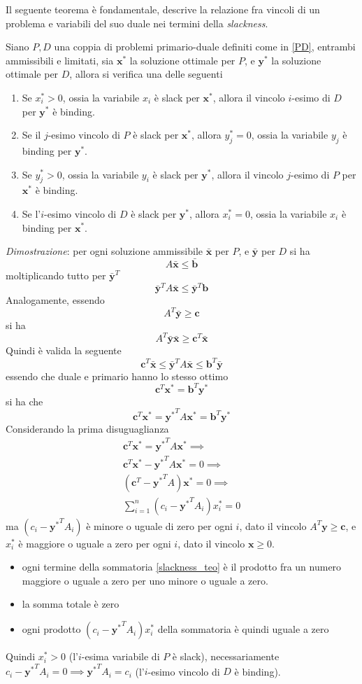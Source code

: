 \documentclass[10pt, letterpaper]{report}
\newcommand{\bb}{{\mathbf{b}}}
\newcommand{\bc}{{\mathbf{c}}}
\newcommand{\x}{{\mathbf{x}}}
\newcommand{\y}{{\mathbf{y}}}
\begin{document}
Il seguente teorema è fondamentale, descrive la relazione fra vincoli di un problema e variabili del suo duale nei termini della \textit{slackness}.
\begin{teorema}\label{complementary_slackness}
    Siano $P,D$ una coppia di problemi primario-duale definiti come in \ref{PD}, entrambi ammissibili e limitati, sia $\x^*$ la soluzione ottimale per $P$, e $\y^*$ la soluzione ottimale per $D$, allora si verifica una delle seguenti\begin{enumerate}
        \item Se $x^*_i>0$, ossia la variabile $x_i$ è slack per $\x^*$, allora il vincolo $i$-esimo di $D$ per $\y^*$ è binding.
        \item Se il $j$-esimo vincolo di $P$ è slack per $\x^*$, allora $y^*_j=0$, ossia
        la variabile $y_j$ è binding per $\y^*$.
        \item Se $y^*_j>0$, ossia la variabile $y_i$ è slack per $\y^*$, allora il vincolo $j$-esimo di $P$ per $\x^*$ è binding.
        \item Se l'$i$-esimo vincolo di $D$ è slack per $\y^*$, allora $x^*_i=0$, ossia
        la variabile $x_i$ è binding per $\x^*$.
    \end{enumerate}
\end{teorema}
\textit{Dimostrazione}: per ogni soluzione ammissibile $\bar\x$ per $P$, e $\bar\y$ per $D$ si ha 
$$ A\bar\x\le\bar \bb$$
moltiplicando tutto per $\bar\y^T$
$$ \bar\y^TA\bar\x\le \bar\y^T\bb$$
Analogamente, essendo 
$$ A^T\bar\y\ge \bc$$
si ha 
$$ A^T\bar\y\bar\x\ge \bc^T\bar\x$$
Quindi è valida la seguente\begin{equation}
    \bc^T\bar\x\le\bar\y^TA\bar\x\le\bb^T\bar\y
\end{equation}
essendo che duale e primario hanno lo stesso ottimo 
$$ \bc^T\x^*=\bb^T\y^*$$
si ha che 
\begin{equation}
     \bc^T\x^*={\y^*}^TA\x^*=\bb^T\y^*
\end{equation}
Considerando la prima disuguaglianza \begin{eqnarray}
     \bc^T\x^*={\y^*}^TA\x^*\implies \\
      \bc^T\x^*-{\y^*}^TA\x^*=0\implies \\
      (\bc^T-{\y^*}^TA)\x^*=0 \implies \\ \label{slackness_teo}
      \sum_{i=1}^n(c_i-{\y^*}^TA_i)x^*_i=0
\end{eqnarray}
ma $(c_i-{\y^*}^TA_i)$ è minore o uguale di zero per ogni $i$, dato il vincolo $A^T\y\ge\bc$, e $x_i^*$ è maggiore o uguale a zero per ogni $i$, dato il vincolo $\x\ge 0$.\begin{itemize}
    \item ogni termine della sommatoria \ref{slackness_teo} è il prodotto fra un numero maggiore o uguale a zero per uno minore o uguale a zero.
    \item la somma totale è zero 
    \item ogni prodotto $(c_i-{\y^*}^TA_i)x^*_i$ della sommatoria è quindi uguale a zero
\end{itemize}
Quindi $x_i^*>0$ (l'$i$-esima variabile di $P$ è slack), necessariamente $c_i-{\y^*}^TA_i=0\implies {\y^*}^TA_i=c_i$ (l'$i$-esimo vincolo di $D$ è binding). 
\end{document}
